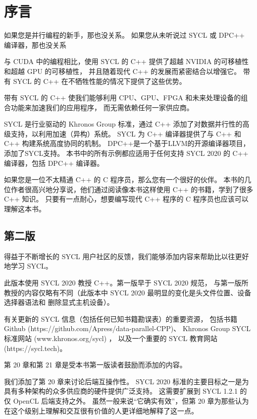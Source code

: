 \section*{序言}
如果您是并行编程的新手，那也没关系。 如果您从未听说过 SYCL 或 DPC++ 编译器，那也没关系

与 CUDA 中的编程相比，使用 SYCL 的 C++ 提供了超越 NVIDIA 的可移植性和超越 GPU 的可移植性，
并且随着现代 C++ 的发展而紧密结合以增强它。 带有 SYCL 的 C++ 在不牺牲性能的情况下提供了这些优势。

带有 SYCL 的 C++ 使我们能够利用 CPU、GPU、FPGA 和未来处理设备的组合功能来加速我们的应用程序，
而无需依赖任何一家供应商。

SYCL 是行业驱动的 Khronos Group 标准，通过 C++ 添加了对数据并行性的高级支持，以利用加速（异构）系统。 
SYCL 为 C++ 编译器提供了与 C++ 和 C++ 构建系统高度协同的机制。 
DPC++是一个基于LLVM的开源编译器项目，添加了SYCL支持。 
本书中的所有示例都应适用于任何支持 SYCL 2020 的 C++ 编译器，包括 DPC++ 编译器。

如果您是一位不太精通 C++ 的 C 程序员，那么您有一个很好的伙伴。 
本书的几位作者很高兴地分享说，他们通过阅读像本书这样使用 C++ 的书籍，学到了很多 C++ 知识。 
只要有一点耐心，想要编写现代 C++ 程序的 C 程序员也应该可以理解这本书。

\subsection*{第二版}
得益于不断增长的 SYCL 用户社区的反馈，我们能够添加内容来帮助比以往更好地学习 SYCL。

此版本使用 SYCL 2020 教授 C++。第一版早于 SYCL 2020 规范，
与第一版所教授的内容仅略有不同（此版本中 SYCL 2020 最明显的变化是头文件位置、设备选择器语法和 删除显式主机设备）。

\begin{remark}
	有关更新的 SYCL 信息（包括任何已知书籍勘误表）的重要资源，
	包括书籍 Github (https://github.com/Apress/data-parallel-CPP)、
	Khronos Group SYCL 标准网站 (www.khronos.org/sycl) ，
	以及一个重要的 SYCL 教育网站 (https://sycl.tech)。
\end{remark}

第 20 章和第 21 章是受本书第一版读者鼓励而添加的内容。

我们添加了第 20 章来讨论后端互操作性。 SYCL 2020 标准的主要目标之一是为具有多种架构的众多供应商的硬件提供广泛支持。 
这需要扩展到 SYCL 1.2.1 的仅 OpenCL 后端支持之外。 
虽然一般来说“它确实有效”，但第 20 章为那些认为在这个级别上理解和交互很有价值的人更详细地解释了这一点。

